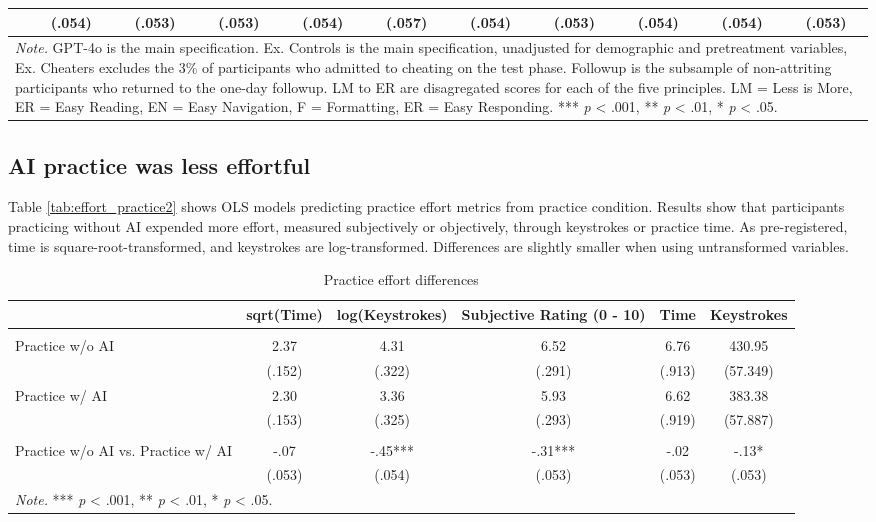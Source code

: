 \documentclass[11pt]{report}
\begin{document}
\begin{append}
\begin{table}[ht]
\begin{tabular}{lcccccccccc}
 & (.054) & (.053) & (.053) & (.054) & (.057) & (.054) & (.053) & (.054) & (.054) & (.053) \\ 
\midrule
\multicolumn{11}{p{16.5cm}}{\textit{Note.} GPT-4o is the main specification. Ex. Controls is the main specification, unadjusted for demographic and pretreatment variables, Ex. Cheaters excludes the 3\% of participants who admitted to cheating on the test phase. Followup is the subsample of non-attriting participants who returned to the one-day followup. LM to ER are disagregated scores for each of the five principles. LM = Less is More, ER = Easy Reading, EN = Easy Navigation, F = Formatting, ER = Easy Responding.  *** \textit{p} < .001, ** \textit{p} < .01, * \textit{p} < .05.}
\vspace{5pt}
\end{tabular}
    \label{tab:s2_test}
\end{table}

\subsection{AI practice was less effortful}

Table \ref{tab:effort_practice2} shows OLS models predicting practice effort metrics from practice condition. Results show that participants practicing without AI expended more effort, measured subjectively or objectively, through keystrokes or practice time. As pre-registered, time is square-root-transformed, and keystrokes are log-transformed. Differences are slightly smaller when using untransformed variables.

\begin{table}[ht]
    \centering
    \caption{Practice effort differences}
\begin{tabular}{lccccc}
\toprule
  & sqrt(Time) & log(Keystrokes) & Subjective Rating (0 - 10) & Time & Keystrokes \\ 
\midrule\addlinespace[2.5pt]
\multicolumn{6}{l}{\textbf{Means --- (SE)}} \\ 
\midrule\addlinespace[2.5pt]
Practice w/o AI & 2.37 & 4.31 & 6.52 & 6.76 & 430.95 \\ 
 & (.152) & (.322) & (.291) & (.913) & (57.349) \\ 
Practice w/ AI & 2.30 & 3.36 & 5.93 & 6.62 & 383.38 \\ 
 & (.153) & (.325) & (.293) & (.919) & (57.887) \\ 
\midrule\addlinespace[2.5pt]
\multicolumn{6}{l}{\textbf{Effect Sizes (d) --- (SE)}} \\ 
\midrule\addlinespace[2.5pt]
Practice w/o AI vs. Practice w/ AI & -.07 & -.45*** & -.31*** & -.02 & -.13* \\ 
 & (.053) & (.054) & (.053) & (.053) & (.053) \\ 
\midrule
\multicolumn{6}{l}{\textit{Note.} *** \textit{p} < .001, ** \textit{p} < .01, * \textit{p} < .05.}
\vspace{5pt}


\end{tabular}
\end{table}
\end{append}
\end{document}
